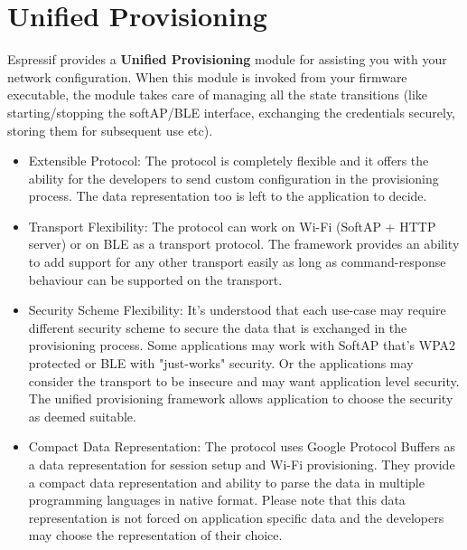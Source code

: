 \documentclass[main.tex]{subfiles}
\begin{document}
\section{Unified Provisioning}\label{sec:unified_prov}

Espressif provides a \textbf{Unified Provisioning} module for assisting you with your network configuration. When this module is invoked from your firmware executable, the module takes care of managing all the state transitions (like starting/stopping the softAP/BLE interface, exchanging the credentials securely, storing them for subsequent use etc).

\begin{itemize}

\item Extensible Protocol: The protocol is completely flexible and it offers the ability for the developers to send custom configuration in the provisioning process. The data representation too is left to the application to decide.
\item Transport Flexibility: The protocol can work on Wi-Fi (SoftAP + HTTP server) or on BLE as a transport protocol. The framework provides an ability to add support for any other transport easily as long as command-response behaviour can be supported on the transport.
\item Security Scheme Flexibility: It’s understood that each use-case may require different security scheme to secure the data that is exchanged in the provisioning process. Some applications may work with SoftAP that’s WPA2 protected or BLE with "just-works" security. Or the applications may consider the transport to be insecure and may want application level security. The unified provisioning framework allows application to choose the security as deemed suitable.
\item Compact Data Representation: The protocol uses Google Protocol Buffers as a data representation for session setup and Wi-Fi provisioning. They provide a compact data representation and ability to parse the data in multiple programming languages in native format. Please note that this data representation is not forced on application specific data and the developers may choose the representation of their choice.

\end{itemize}
\end{document}
